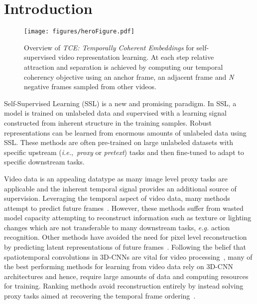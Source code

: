 \documentclass[a4paper,conference]{IEEEtran}
\newcommand{\ie}{\emph{i.e.},}
\begin{document}
\IEEEpeerreviewmaketitle
\section{Introduction}
\label{sec:intro}

\begin{figure*}[t]
\centering  
\texttt{[image: figures/heroFigure.pdf]}
\caption{Overview of \textit{TCE: Temporally Coherent Embeddings} for self-supervised video representation learning. At each step relative attraction and separation is achieved by computing our temporal coherency objective using an anchor frame, an adjacent frame and \textit{N} negative frames sampled from other videos.} \label{fig:a}
\end{figure*}


Self-Supervised Learning (SSL) is a new and promising paradigm. In SSL, a model is trained on unlabeled data and supervised with a learning signal constructed from inherent structure in the training samples. Robust representations can be learned from enormous amounts of unlabeled data using SSL. These methods are often pre-trained on large unlabeled datasets with specific upstream (\ie{}~\textit{proxy} or \textit{pretext}) tasks and then fine-tuned to adapt to specific downstream tasks.

Video data is an appealing datatype as many image level proxy tasks are applicable and the inherent temporal signal provides an additional source of supervision. Leveraging the temporal aspect of video data, many methods attempt to predict future frames~\cite{lotter2016deep,mathieu2015deep,srivastava2015unsupervised,vondrick2016generating}. However, these methods suffer from wasted model capacity attempting to reconstruct information such as texture or lighting changes which are not transferable to many downstream tasks, \textit{e.g.} action recognition.
Other methods have avoided the need for pixel level reconstruction by predicting latent representations of future frames~\cite{han2019video,vondrick2016anticipating}. Following the belief that spatiotemporal convolutions in 3D-CNNs are vital for video processing~\cite{tran2018closer}, many of the best performing methods for learning from video data rely on 3D-CNN architectures and hence, require large amounts of data and computing resources for training. Ranking methods avoid reconstruction entirely by instead solving proxy tasks aimed at recovering the temporal frame ordering~\cite{el2019skip,fernando2017self,kim2019self,lee2017unsupervised,misra2016shuffle,xu2019self}.
\end{document}
